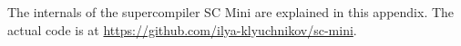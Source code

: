 %

\begin{introduction}
%

\noindent The internals of the supercompiler SC Mini are explained in this appendix.
The actual code is at \url{https://github.com/ilya-klyuchnikov/sc-mini}.
\end{introduction}

